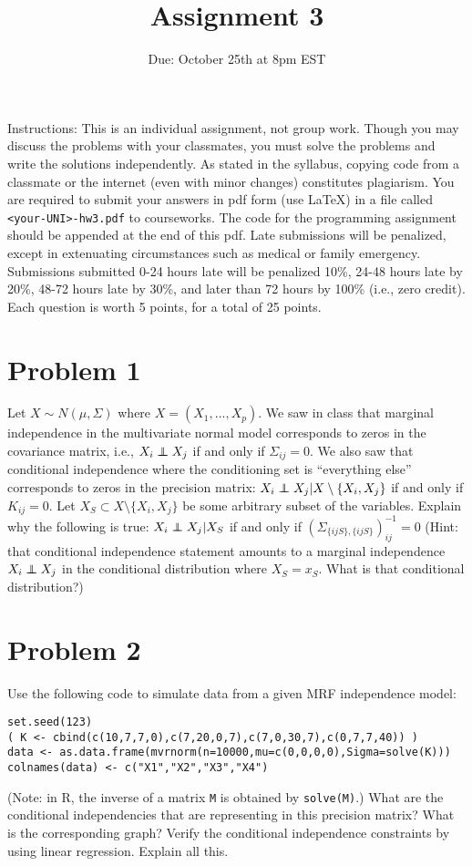 \documentclass[letterpaper]{article}
\title{Assignment 3}
\author{}
\date{Due: October 25th at 8pm EST}
\newcommand\independent{\protect\mathpalette{\protect\independenT}{\perp}}
\def\independenT#1#2{\mathrel{\rlap{$#1#2$}\mkern2mu{#1#2}}}
\def\independenT#1#2{\mathrel{\rlap{$#1#2$}\mkern2mu{#1#2}}}
\begin{document}
\maketitle

	Instructions: This is an individual assignment, not group work. Though you may
	discuss the problems with your classmates, you must solve the problems and
	write the solutions independently. As stated in the syllabus, copying code
	from a classmate or the internet (even with minor changes) constitutes
	plagiarism. You are required to submit your answers in pdf form (use \LaTeX)
	in a file called \texttt{<your-UNI>-hw3.pdf} to courseworks. 
	The code for the programming assignment should be appended at the end of this pdf.
	Late submissions will be penalized, except in extenuating circumstances such
	as medical or family emergency. Submissions submitted 0-24 hours late will be
	penalized 10\%, 24-48 hours late by 20\%, 48-72 hours late by 30\%, and later
	than 72 hours by 100\% (i.e., zero credit). Each question is worth 5 points, for a total of 25 points.

\section*{Problem 1}

Let $X \sim N(\mu, \Sigma)$ where $X = (X_1,...,X_p)$. We saw in class that marginal independence in the multivariate normal model corresponds to zeros in the covariance matrix, i.e., $X_i \independent X_j$ if and only if $\Sigma_{ij} = 0$. We also saw that conditional independence where the conditioning set is ``everything else'' corresponds to zeros in the precision matrix: $X_i \independent X_j | X \setminus\{X_i,X_j\}$ if and only if $K_{ij}=0$. Let $X_S \subset X\setminus\{X_i,X_j\}$ be some arbitrary subset of the variables. Explain why the following is true: $X_i \independent X_j | X_S $ if and only if $( \Sigma_{\{ijS\},\{ijS\} } )^{-1}_{ij} = 0$ (Hint: that conditional independence statement amounts to a marginal independence $X_i \independent X_j$ in the conditional distribution where $X_S = x_S$. What is that conditional distribution?)

\section*{Problem 2}

Use the following code to simulate data from a given MRF independence model:
\begin{verbatim}
set.seed(123)
( K <- cbind(c(10,7,7,0),c(7,20,0,7),c(7,0,30,7),c(0,7,7,40)) )
data <- as.data.frame(mvrnorm(n=10000,mu=c(0,0,0,0),Sigma=solve(K)))
colnames(data) <- c("X1","X2","X3","X4")
\end{verbatim}
(Note: in R, the inverse of a matrix \texttt{M} is obtained by \texttt{solve(M)}.) What are the conditional independencies that are representing in this precision matrix? What is the corresponding graph? Verify the conditional independence constraints by using linear regression. Explain all this.
\end{document}
